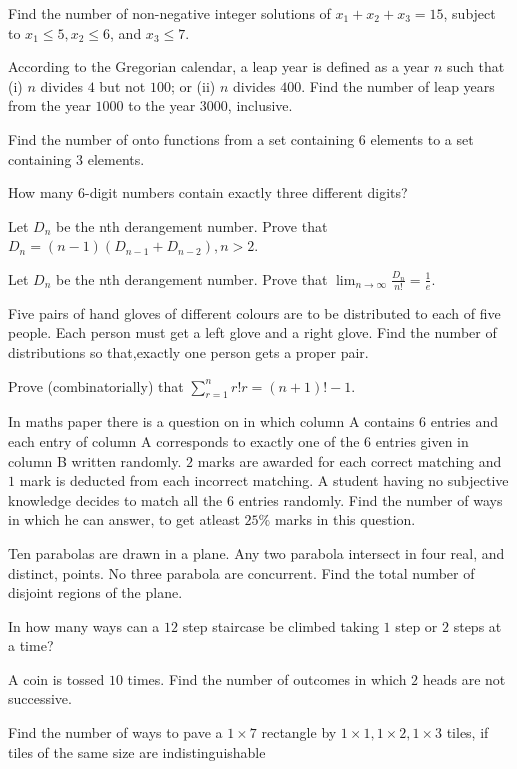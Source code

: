 \item Find the number of non-negative integer solutions of $x_1 + x_2 + x_3 =15$, subject to $x_1 \leq 5,
  x_2 \leq 6$, and $x_3 \leq 7$.
\item According to the Gregorian calendar, a leap year is defined as a year $n$ such that (i) $n$ divides
  $4$ but not $100$; or (ii) $n$ divides $400$. Find the number of leap years from the year $1000$ to the
  year $3000$, inclusive.
\item Find the number of onto functions from a set containing $6$ elements to a set containing $3$ elements.
\item How many $6$-digit numbers contain exactly three different digits?
\item Let $D_n$ be the nth derangement number. Prove that $D_n = (n - 1)(D_{n - 1} + D_{n - 2}), n > 2$.
\item Let $D_n$ be the nth derangement number. Prove that $\displaystyle\lim_{n\to\infty}\frac{D_n}{n!} =
  \frac{1}{e}$.
\item Five pairs of hand gloves of different colours are to be distributed to each of five people. Each
  person must get a left glove and a right glove. Find the number of distributions so that,exactly one
  person gets a proper pair.
\item Prove (combinatorially) that $\displaystyle\sum_{r = 1}^n r ! r = ( n + 1)! − 1$.
\item In maths paper there is a question on  in which column A contains $6$ entries
  and each entry of column A corresponds to exactly one of the $6$ entries given in column B written
  randomly. $2$ marks are awarded for each correct matching and $1$ mark is deducted from each incorrect
  matching. A student having no subjective knowledge decides to match all the 6 entries randomly. Find the
  number of ways in which he can answer, to get atleast $25\%$ marks in this question.
\item Ten parabolas are drawn in a plane. Any two parabola intersect in four real, and distinct, points. No
  three parabola are concurrent. Find the total number of disjoint regions of the plane.
\item In how many ways can a $12$ step staircase be climbed taking $1$ step or $2$ steps at a time?
\item A coin is tossed $10$ times. Find the number of outcomes in which $2$ heads are not successive.
\item Find the number of ways to pave a $1\times7$ rectangle by $1\times1, 1\times2, 1\times3$ tiles, if
  tiles of the same size are indistinguishable
\stopitemize
